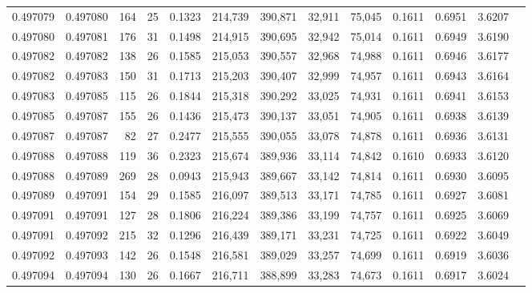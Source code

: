 \begin{tabular}{rrrrrrrrrrrrr}
0.497079 & 0.497080 & 164 &  25 &                                     0.1323 & 214,739 & 390,871 &  32,911 &  75,045 & 0.1611 & 0.6951 & 3.6207 \\
0.497080 & 0.497081 & 176 &  31 &                                     0.1498 & 214,915 & 390,695 &  32,942 &  75,014 & 0.1611 & 0.6949 & 3.6190 \\
0.497082 & 0.497082 & 138 &  26 &                                     0.1585 & 215,053 & 390,557 &  32,968 &  74,988 & 0.1611 & 0.6946 & 3.6177 \\
0.497082 & 0.497083 & 150 &  31 &                                     0.1713 & 215,203 & 390,407 &  32,999 &  74,957 & 0.1611 & 0.6943 & 3.6164 \\
0.497083 & 0.497085 & 115 &  26 &                                     0.1844 & 215,318 & 390,292 &  33,025 &  74,931 & 0.1611 & 0.6941 & 3.6153 \\
0.497085 & 0.497087 & 155 &  26 &                                     0.1436 & 215,473 & 390,137 &  33,051 &  74,905 & 0.1611 & 0.6938 & 3.6139 \\
0.497087 & 0.497087 &  82 &  27 &                                     0.2477 & 215,555 & 390,055 &  33,078 &  74,878 & 0.1611 & 0.6936 & 3.6131 \\
0.497088 & 0.497088 & 119 &  36 &                                     0.2323 & 215,674 & 389,936 &  33,114 &  74,842 & 0.1610 & 0.6933 & 3.6120 \\
0.497088 & 0.497089 & 269 &  28 &                                     0.0943 & 215,943 & 389,667 &  33,142 &  74,814 & 0.1611 & 0.6930 & 3.6095 \\
0.497089 & 0.497091 & 154 &  29 &                                     0.1585 & 216,097 & 389,513 &  33,171 &  74,785 & 0.1611 & 0.6927 & 3.6081 \\
0.497091 & 0.497091 & 127 &  28 &                                     0.1806 & 216,224 & 389,386 &  33,199 &  74,757 & 0.1611 & 0.6925 & 3.6069 \\
0.497091 & 0.497092 & 215 &  32 &                                     0.1296 & 216,439 & 389,171 &  33,231 &  74,725 & 0.1611 & 0.6922 & 3.6049 \\
0.497092 & 0.497093 & 142 &  26 &                                     0.1548 & 216,581 & 389,029 &  33,257 &  74,699 & 0.1611 & 0.6919 & 3.6036 \\
0.497094 & 0.497094 & 130 &  26 &                                     0.1667 & 216,711 & 388,899 &  33,283 &  74,673 & 0.1611 & 0.6917 & 3.6024 \\

\end{tabular}
